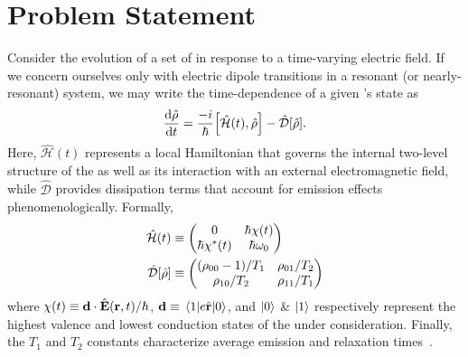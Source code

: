 \section{\label{section:problem statement}Problem Statement}
Consider the evolution of a set of \qds{} in response to a time-varying electric field.
If we concern ourselves only with electric dipole transitions in a resonant (or nearly-resonant) system, we may write the time-dependence of a given \qd's state as
\begin{equation}
  \dv{\hat{\rho}}{t} = \frac{-i}{\hbar}\commutator{\hat{\mathcal{H}}(t)}{\hat{\rho}} - \hat{\mathcal{D}}\qty[\hat{\rho}].
  \label{eq:liouville}
\end{equation}
Here, $\hat{\mathcal{H}}(t)$ represents a local Hamiltonian that governs the internal two-level structure of the \qd{} as well as its interaction with an external electromagnetic field, while $\hat{\mathcal{D}}$ provides dissipation terms that account for emission effects phenomenologically.
Formally,
\begin{subequations}
  \begin{align}
    \hat{\mathcal{H}}(t) &\equiv \mqty(0 & \hbar \chi(t) \\ \hbar \chi^*(t) & \hbar \omega_0) \label{eq:hamiltonian}\\
    \hat{\mathcal{D}}\qty[\hat{\rho}] &\equiv \mqty( \qty(\rho_{00} - 1)/{T_1} & \rho_{01}/{T_2} \\ \rho_{10}/{T_2} & \rho_{11}/T_1 ) \label{eq:dissipator}
  \end{align}
\end{subequations}
where $\chi(t) \equiv \vb{d} \cdot \hat{\vb{E}}(\vb{r}, t)/\hbar$, $\vb{d} \equiv \matrixel{1}{e \hat{\vb{r}}}{0}$, and $\ket{0}$ \& $\ket{1}$ respectively represent the highest valence and lowest conduction states of the \qd{} under consideration.
Finally, the $T_1$ and $T_2$ constants characterize average emission and relaxation times~\cite{}.

